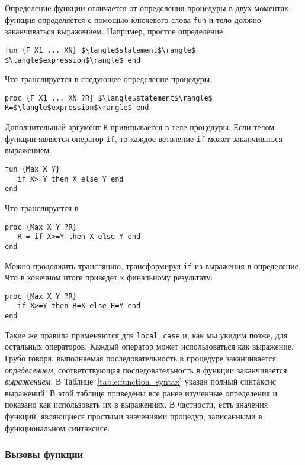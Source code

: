 Определение функции отличается от определения процедуры в двух моментах: функция определяется с помощью ключевого слова \lstinline|fun| и тело должно заканчиваться выражением. Например, простое определение:

\begin{lstlisting}
fun {F X1 ... XN} $\langle$statement$\rangle$ $\langle$expression$\rangle$ end
\end{lstlisting}

Что транслируется в следующее определение процедуры:

\begin{lstlisting}
proc {F X1 ... XN ?R} $\langle$statement$\rangle$ R=$\langle$expression$\rangle$ end
\end{lstlisting}

Дополнительный аргумент \lstinline|R| привязывается в теле процедуры. Если телом функции является оператор \lstinline|if|, то каждое ветвление \lstinline|if| может заканчиваться выражением:

\begin{lstlisting}
fun {Max X Y}
   if X>=Y then X else Y end
end
\end{lstlisting}

Что транслируется в

\begin{lstlisting}
proc {Max X Y ?R}
   R = if X>=Y then X else Y end
end
\end{lstlisting}

Можно продолжить трансляцию, трансформируя \lstinline|if| из выражения в определение. Что в конечном итоге приведёт к финальному результату:

\begin{lstlisting}
proc {Max X Y ?R}
   if X>=Y then R=X else R=Y end
end
\end{lstlisting}

Такие же правила применяются для \lstinline|local|, \lstinline|case| и, как мы увидим позже, для остальных операторов. Каждый оператор может использоваться как выражение. Грубо говоря, выполняемая последовательность в процедуре заканчивается \emph{определением}, соответствующая последовательность в функции заканчивается \emph{выражением}. В Таблице~\ref{table:function_syntax} указан полный синтаксис выражений. В этой таблице приведены все ранее изученные определения и показано как использовать их в выражениях. В частности, есть значения функций, являющиеся простыми значениями процедур, записанными в функциональном синтаксисе.

\subsubsection{Вызовы функции}

